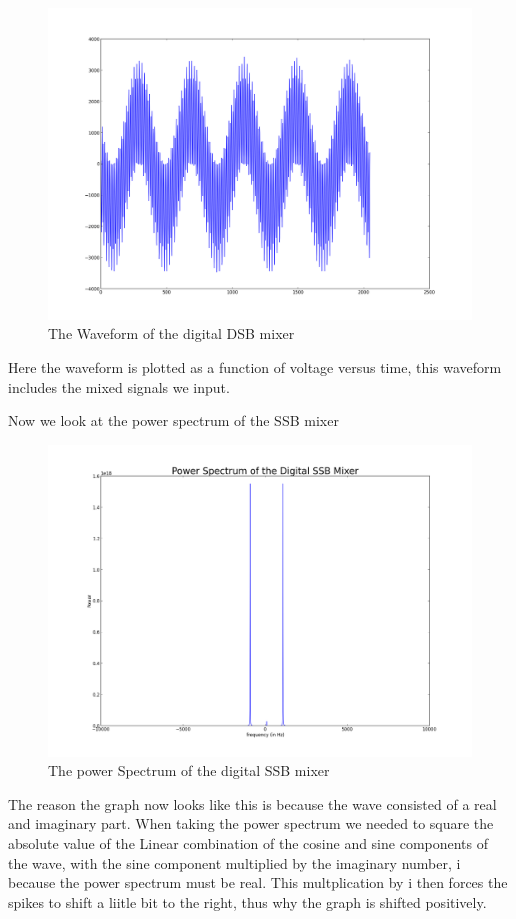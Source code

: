 \documentclass[12 pt]{article}
\begin{document}
\begin{figure}[H]
\center
\includegraphics[scale=0.4]{digmixdsbwaveform.png}
\caption{The Waveform of the digital DSB mixer}
\label{wavedsb}
\end{figure}
Here the waveform is plotted as a function of voltage versus time, this
waveform includes the mixed signals we input.


Now we look at the power spectrum of the SSB mixer 

\begin{figure}[H]
\center
\includegraphics[scale=0.4]{powerspectdigssbmix.png}
\caption{The power Spectrum of the digital SSB mixer}
\label{digssb}
\end{figure}
The reason the graph now looks like this is because the wave consisted
of a real and imaginary part. When taking the power spectrum we needed
to square the absolute value of the Linear combination of the cosine and
sine components of the wave,  with the sine component multiplied by the
imaginary number, i because the power spectrum must be real. This
multplication by i then forces the spikes to shift a liitle bit to the
right, thus why the graph is shifted positively.
\end{document}
